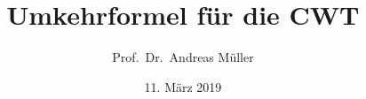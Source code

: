 %
%
%
\usepackage[utf8]{inputenc}
\usepackage[T1]{fontenc}
\usepackage{epic}
\usepackage{color}
\usepackage{array}
\usepackage{ifthen}
\usepackage{amsmath}
\usepackage{lmodern}
\usepackage{tikz}
\usetikzlibrary{shapes.geometric}
\beamertemplatenavigationsymbolsempty
\title[Umkehrformel]{Umkehrformel für die CWT}
\author[A.~Müller]{Prof.~Dr.~Andreas Müller}
\date[]{11. März 2019}

\theoremstyle{definition}
\newtheorem{umkehrformel}{Umkehrformel}
\newtheorem{cwt}{Stetige Wavelet-Transformation}
\newtheorem{vergleich}{Vergleichsprinzip}

\newtheorem{parseval}{Parseval-Formel für Fourier-Reihen}
\newtheorem{plancherel}{Plancherel-Formel für Fourier-Transformation}
\newtheorem{plancherelW}{Plancherel-Formel für $\mathcal{W}$}
\newtheorem{zulaessig}{Zulässigkeitsbedingung}
\newtheorem{umkehrformelW}{Umkehrformel für $\mathcal{W}$}
\newtheorem{aufgabe}{Aufgaben}

